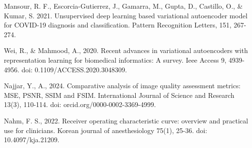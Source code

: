 \begin{thebibliography}{9}
  Mansour, R. F., Escorcia-Gutierrez, J., Gamarra, M., Gupta, D.,
  Castillo, O., \& Kumar, S. 2021. Unsupervised deep learning based
  variational autoencoder model for COVID-19 diagnosis and
  classification. Pattern Recognition Letters, 151, 267-274.


  Wei, R., \& Mahmood, A., 2020. Recent advances in variational
  autoencoders with representation learning for biomedical
  informatics: A survey. Ieee Access 9, 4939-4956. doi:
  0.1109/ACCESS.2020.3048309.

  Najjar, Y., A., 2024. Comparative analysis of image quality
  assessment metrics: MSE, PSNR, SSIM and FSIM. International Journal
  of Science and Research 13(3), 110-114. doi: orcid.org/0000-0002-3369-4999.

  Nahm, F. S., 2022. Receiver operating characteristic curve:
  overview and practical use for clinicians. Korean journal of
  anesthesiology 75(1), 25-36. doi: 10.4097/kja.21209.

\end{thebibliography}
